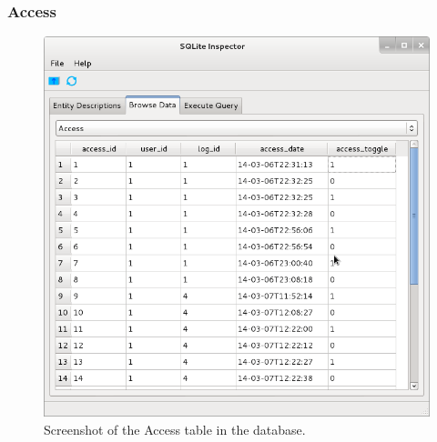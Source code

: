 \documentclass[a4paper]{article}
\begin{document}
        \subsubsection{Access}
            \begin{figure}[H]
                \caption{Screenshot of the Access table in the database.}
                \centering
                \includegraphics[scale=0.5]{../shared_assets/screenshots/database_access.png}
            \end{figure}
\end{document}
